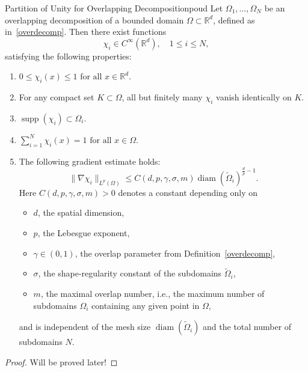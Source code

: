 \documentclass[a4paper, 11pt]{article}
\theoremstyle{remark}
\begin{document}
\begin{lemma}{Partition of Unity for Overlapping Decomposition}{poud}
Let $\Omega_1, \dots, \Omega_N$ be an overlapping decomposition of a bounded domain $\Omega \subset \mathbb{R}^d$, defined as in~\ref{overdecomp}. Then there exist functions
\begin{equation*}
    \chi_i \in C^\infty(\mathbb{R}^d), \quad 1 \leq i \leq N,
\end{equation*}
satisfying the following properties:
\begin{enumerate}[label = (\roman*)]
    \item $0 \leq \chi_i(x) \leq 1 \text{ for all } x \in \mathbb{R}^d.$ 
    \item For any compact set $K \subset \Omega$, all but finitely many $\chi_i$ vanish identically on $K$.
    \item $\operatorname{supp}(\chi_i) \subset \Omega_i.$
    \item $\sum\limits_{i=1}^{N} \chi_i(x) = 1 \text{ for all } x \in \Omega.$
    \item The following gradient estimate holds:
    \begin{equation*}
        \lVert \nabla \chi_i\rVert_{L^{p}(\Omega)} \leq C(d, p, \gamma, \sigma, m)\operatorname{diam}(\widetilde{\Omega}_{i})^{\frac{d}{p}-1}.
    \end{equation*}
    Here $C(d,p,\gamma,\sigma,m) > 0$ denotes a constant depending only on
    \begin{itemize}
        \item $d$, the spatial dimension,
        \item $p$, the Lebesgue exponent,
        \item $\gamma \in (0,1)$, the overlap parameter from Definition~\ref{overdecomp},
        \item $\sigma$, the shape-regularity constant of the subdomains $\widetilde{\Omega}_i$,
        \item $m$, the maximal overlap number, i.e., the maximum number of subdomains $\Omega_i$ containing any given point in $\Omega$,
    \end{itemize}
and is independent of the mesh size $\operatorname{diam}(\widetilde{\Omega}_{i})$ and the total number of subdomains $N$.
\end{enumerate}
\end{lemma}

\begin{proof}
    Will be proved later!
\end{proof}
\end{document}

